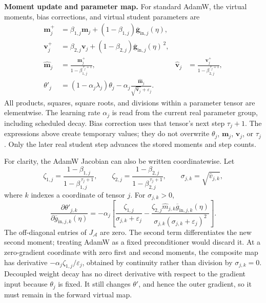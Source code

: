 \documentclass{article}
\theoremstyle{plain}
\theoremstyle{definition}
\theoremstyle{remark}
\begin{document}
\textbf{Moment update and parameter map.}
For standard AdamW, the virtual moments, bias corrections, and virtual student parameters are
\begin{equation}
\begin{aligned}
    \boldsymbol m_j^+
    &=\beta_{1,j}\boldsymbol m_j+(1-\beta_{1,j})\overline{\boldsymbol g}_{\mathrm{in},j}(\eta),\\
    \boldsymbol v_j^+
    &=\beta_{2,j}\boldsymbol v_j+(1-\beta_{2,j})\overline{\boldsymbol g}_{\mathrm{in},j}(\eta)^{\,2},\\
    \widehat{\boldsymbol m}_j
    &=\frac{\boldsymbol m_j^+}{1-\beta_{1,j}^{\,\tau_j+1}},
    &\widehat{\boldsymbol v}_j
    &=\frac{\boldsymbol v_j^+}{1-\beta_{2,j}^{\,\tau_j+1}},\\
    \theta'_j
    &=(1-\alpha_j\lambda_j)\theta_j
      -\alpha_j\frac{\widehat{\boldsymbol m}_j}
      {\sqrt{\widehat{\boldsymbol v}_j}+\varepsilon_j}.
\end{aligned}
\label{eq:appendix-adamw-map}
\end{equation}
All products, squares, square roots, and divisions within a parameter tensor are elementwise.
The learning rate \(\alpha_j\) is read from the current real parameter group, including scheduled
decay. Bias correction uses that tensor's next step \(\tau_j+1\). The expressions above create
temporary values; they do not overwrite \(\theta_j\), \(\boldsymbol m_j\), \(\boldsymbol v_j\),
or \(\tau_j\). Only the later real student step advances the stored moments and step counts.

For clarity, the AdamW Jacobian can also be written coordinatewise. Let
\[
    \zeta_{1,j}=\frac{1-\beta_{1,j}}{1-\beta_{1,j}^{\,\tau_j+1}},\qquad
    \zeta_{2,j}=\frac{1-\beta_{2,j}}{1-\beta_{2,j}^{\,\tau_j+1}},\qquad
    \sigma_{j,k}=\sqrt{\widehat v_{j,k}},
\]
where \(k\) indexes a coordinate of tensor \(j\). For \(\sigma_{j,k}>0\),
\begin{equation}
    \frac{\partial\theta'_{j,k}}{\partial\overline g_{\mathrm{in},j,k}(\eta)}
    =-\alpha_j\left[
        \frac{\zeta_{1,j}}{\sigma_{j,k}+\varepsilon_j}
        -\frac{\zeta_{2,j}\widehat m_{j,k}\overline g_{\mathrm{in},j,k}(\eta)}
        {\sigma_{j,k}(\sigma_{j,k}+\varepsilon_j)^2}
    \right].
\label{eq:appendix-adamw-jacobian}
\end{equation}
The off-diagonal entries of \(J_{\mathcal A}\) are zero. The second term differentiates the
new second moment; treating AdamW as a fixed preconditioner would discard it. At a zero-gradient
coordinate with zero first and second moments, the composite map has derivative
\(-\alpha_j\zeta_{1,j}/\varepsilon_j\), obtained by continuity rather than division by
\(\sigma_{j,k}=0\). Decoupled weight decay has no direct derivative with respect to the gradient
input because \(\theta_j\) is fixed. It still changes \(\theta'\), and hence the outer gradient,
so it must remain in the forward virtual map.
\end{document}

